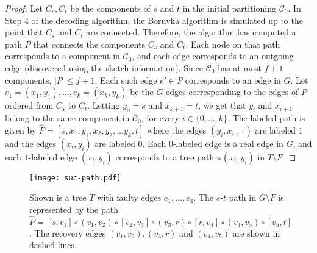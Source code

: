 \begin{proof}
Let $C_s, C_t$ be the components of $s$ and $t$ in the initial partitioning $\mathcal{C}_0$. In Step $4$ of the decoding algorithm, the Boruvka algorithm is simulated up to the point that $C_s$ and $C_t$ are connected. Therefore, the algorithm has computed a path $P$ that connects the components $C_s$ and $C_t$. Each node on that path corresponds to a component in $\mathcal{C}_0$, and each edge corresponds to an outgoing edge (discovered using the sketch information). Since $\mathcal{C}_0$ has at most $f+1$ components, $|P|\leq f+1$. 
Each such edge $e' \in P$ corresponds to an edge in $G$. Let $e_1=(x_1,y_1),\ldots, e_k=(x_k,y_k)$ be the $G$-edges corresponding to the edges of $P$ ordered from $C_s$ to $C_t$. Letting $y_0=s$ and $x_{k+1}=t$, we get that 
$y_i$ and $x_{i+1}$ belong to the same component in $\mathcal{C}_0$, for every $i \in \{0,\ldots, k\}$. 
The labeled path is given by $\widehat{P}=[s, x_1,y_1, x_2, y_2, \ldots y_k,t]$ where the edges $(y_i,x_{i+1})$ are labeled $1$ and the edges $(x_{i}, y_i)$ are labeled $0$. Each $0$-labeled edge is a real edge in $G$, and each $1$-labeled edge $(x_{i}, y_i)$ corresponds to a tree path $\pi(x_i, y_i)$ in $T \setminus F$. 
\end{proof}


\begin{figure}[h!]
\begin{center}
\texttt{[image: suc-path.pdf]}
\caption{\sf Shown is a tree $T$ with faulty edges $e_1,\ldots, e_4$. The $s$-$t$ path in $G \setminus F$ is represented by the path $\widehat{P}=[s,v_1]\circ (v_1,v_2) \circ [v_2,v_3] \circ (v_3,r) \circ [r,v_4] \circ (v_4, v_5) \circ [v_5,t]$. The recovery edges $(v_1,v_2), (v_3,r)$ and $(v_4, v_5)$ are shown in dashed lines.  \label{fig:succ-paths}
}
\end{center}
\end{figure}
